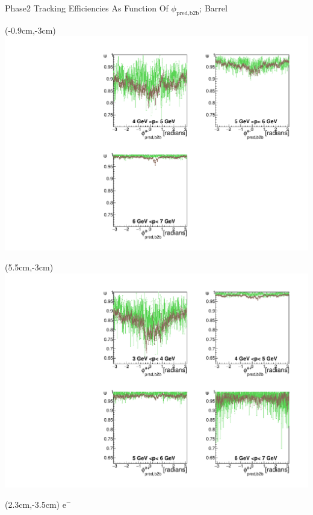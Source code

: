 \documentclass[8pt]{beamer}
\begin{document}
\begin{frame}{Phase2 Tracking Efficiencies As Function Of $\phi_{\textrm{pred,b2b}}$; Barrel}
	
	
	\begin{textblock*}{6.5cm}(-0.9cm,-3cm)
		\includegraphics[width=\textwidth]{VPlots/P2/xPMPhiemBarrel}
	\end{textblock*}
	
		\begin{textblock*}{6.5cm}(5.5cm,-3cm)
		\includegraphics[width=\textwidth]{VPlots/P2/xPMPhiepBarrel}
	\end{textblock*}
	
	
	\begin{textblock*}{2cm}(2.3cm,-3.5cm)
		$\textrm{e}^-$
	\end{textblock*}
	

\end{frame}
\end{document}
